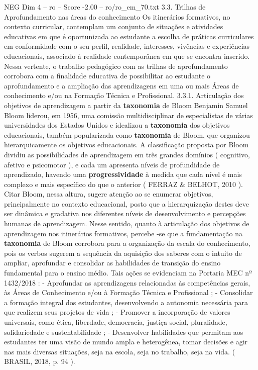 \begin{textsample}{NEG Dim 4 – ro – Score -2.00 – ro/ro\_em\_70.txt}  \label{ex:f4_neg_080}
3.3.
Trilhas de Aprofundamento nas áreas do conhecimento Os itinerários formativos, no contexto curricular, contemplam um conjunto de situações e atividades educativas em que é oportunizada ao estudante a escolha de práticas curriculares em conformidade com o seu perfil, realidade, interesses, vivências e experiências educacionais, associado à realidade contemporânea em que se encontra inserido.
Nessa vertente, o trabalho pedagógico com as trilhas de aprofundamento corrobora com a finalidade educativa de possibilitar ao estudante o aprofundamento e a ampliação das aprendizagens em uma ou mais Áreas de conhecimento e/ou na Formação Técnica e Profissional. 3.3.1.
Articulação dos objetivos de aprendizagem a partir da \textbf{taxonomia} de Bloom Benjamin Samuel Bloom liderou, em 1956, uma comissão multidisciplinar de especialistas de várias universidades dos Estados Unidos e idealizou a \textbf{taxonomia} dos objetivos educacionais, também popularizada como \textbf{taxonomia} de Bloom, que organizou hierarquicamente os objetivos educacionais.
A classificação proposta por Bloom dividiu as possibilidades de aprendizagem em três grandes domínios ( cognitivo, afetivo e psicomotor ), e cada um apresenta níveis de profundidade de aprendizado, havendo uma \textbf{progressividade} à medida que cada nível é mais complexo e mais específico do que o anterior ( FERRAZ \& BELHOT, 2010 ).
Citar Bloom, nessa altura, sugere atenção ao se enumerar objetivos, principalmente no contexto educacional, posto que a hierarquização destes deve ser dinâmica e gradativa nos diferentes níveis de desenvolvimento e percepções humanas de aprendizagem.
Nesse sentido, quanto à articulação dos objetivos de aprendizagem nos itinerários formativos, percebe -se que a fundamentação na \textbf{taxonomia} de Bloom corrobora para a organização da escala do conhecimento, pois os verbos sugerem a sequência da aquisição dos saberes com o intuito de ampliar, aprofundar e consolidar as habilidades de transição do ensino fundamental para o ensino médio.
Tais ações se evidenciam na Portaria MEC nº 1432/2018 : - Aprofundar as aprendizagens relacionadas às competências gerais, às Áreas de Conhecimento e/ou à Formação Técnica e Profissional ; - Consolidar a formação integral dos estudantes, desenvolvendo a autonomia necessária para que realizem seus projetos de vida ; - Promover a incorporação de valores universais, como ética, liberdade, democracia, justiça social, pluralidade, solidariedade e sustentabilidade ; - Desenvolver habilidades que permitam aos estudantes ter uma visão de mundo ampla e heterogênea, tomar decisões e agir nas mais diversas situações, seja na escola, seja no trabalho, seja na vida. ( BRASIL, 2018, p. 94 ).

\end{textsample}
